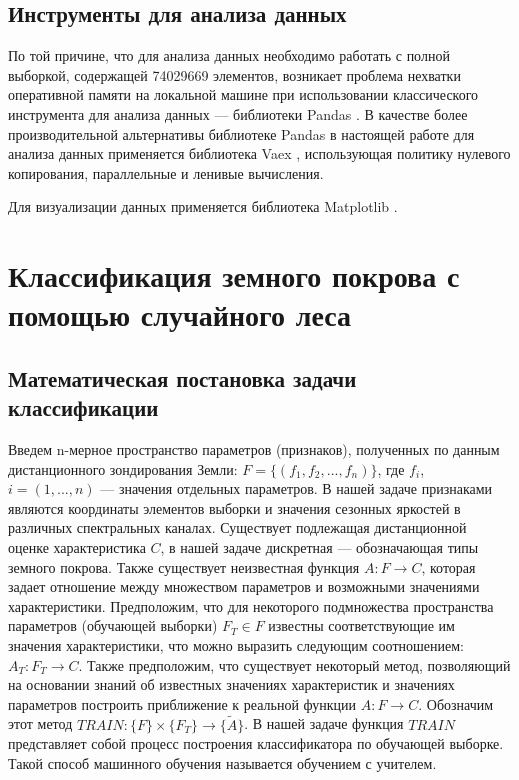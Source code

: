 \documentclass[14pt, a4paper, oneside]{extarticle}
\begin{document}
\subsection{Инструменты для анализа данных}
По той причине, что для анализа данных необходимо работать с полной выборкой, содержащей 74029669 элементов, возникает проблема нехватки оперативной памяти на локальной машине при использовании классического инструмента для анализа данных --- библиотеки Pandas \cite{pandas}. В качестве более производительной альтернативы библиотеке Pandas в настоящей работе для анализа данных применяется библиотека Vaex \cite{vaex}, использующая политику нулевого копирования, параллельные и ленивые вычисления.

Для визуализации данных применяется библиотека Matplotlib \cite{matplotlib}.

\newpage

\section{Классификация земного покрова с помощью случайного леса}
\subsection{Математическая постановка задачи классификации}
Введем n-мерное пространство параметров (признаков), полученных по данным дистанционного зондирования Земли: $F=\{(f_1, f_2, ..., f_n)\}$, где $f_i$, $i=(1, ..., n)$ --- значения отдельных параметров. В нашей задаче признаками являются координаты элементов выборки и значения сезонных яркостей в различных спектральных каналах. Существует подлежащая дистанционной оценке характеристика $C$, в нашей задаче дискретная --- обозначающая типы земного покрова. Также существует неизвестная функция $A: F \to C$, которая задает отношение между множеством параметров и возможными значениями характеристики. Предположим, что для некоторого подмножества пространства параметров (обучающей выборки) $F_T \in F$ известны соответствующие им значения характеристики, что можно выразить следующим соотношением: $A_T: F_T \to C$. Также предположим, что существует некоторый метод, позволяющий на основании знаний об известных значениях характеристик и значениях параметров построить приближение к реальной функции $A: F \to C$. Обозначим этот метод $TRAIN: \{F\} \times \{F_T\} \to \{\widetilde{A}\}$. В нашей задаче функция $TRAIN$ представляет собой процесс построения классификатора по обучающей выборке. Такой способ машинного обучения называется обучением с учителем.
\end{document}
